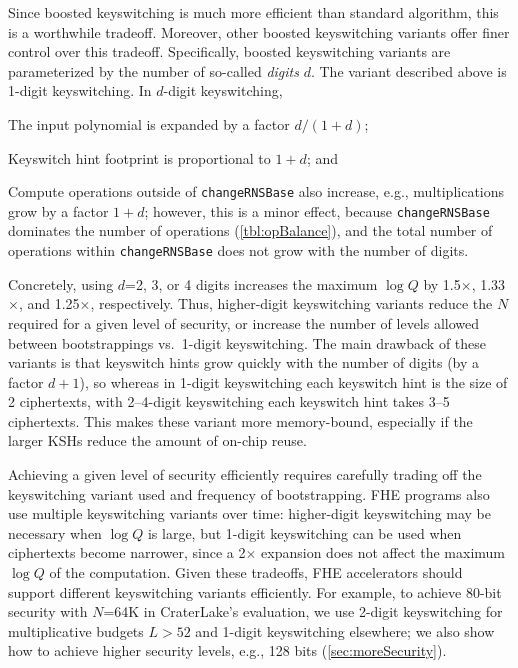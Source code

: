 Since boosted keyswitching is much more efficient than standard algorithm, this
is a worthwhile tradeoff. Moreover, other boosted keyswitching variants offer
finer control over this tradeoff. Specifically, boosted keyswitching variants
are parameterized by the number of so-called \emph{digits} $d$. The variant
described above is 1-digit keyswitching.
In $d$-digit keyswitching,
\begin{compactenum}
\item The input polynomial is expanded by a factor $d/(1+d)$;
\item Keyswitch hint footprint is proportional to $1+d$; and
\item Compute operations outside of \texttt{changeRNSBase} also increase, e.g.,
    multiplications grow by a factor $1+d$; however, this is a minor effect,
    because \texttt{changeRNSBase} dominates the number of operations
    (\autoref{tbl:opBalance}), and the total number of operations within
    \texttt{changeRNSBase} does not grow with the number of digits.
\end{compactenum}

Concretely, using $d$=2, 3, or 4 digits increases the maximum $\log Q$ by
1.5$\times$, 1.33$\times$, and 1.25$\times$, respectively. Thus, higher-digit
keyswitching variants reduce the $N$ required for a given level of security, or
increase the number of levels allowed between bootstrappings vs.\ 1-digit
keyswitching. The main drawback of these variants is that keyswitch hints grow
quickly with the number of digits (by a factor $d+1$), so whereas in 1-digit
keyswitching each keyswitch hint is the size of 2 ciphertexts, with 2--4-digit
keyswitching each keyswitch hint takes 3--5 ciphertexts. This makes these
variant more memory-bound, especially if the larger KSHs reduce the amount of
on-chip reuse.

Achieving a given level of security efficiently requires carefully trading off
the keyswitching variant used and frequency of bootstrapping. FHE programs also
use multiple keyswitching variants over time: higher-digit keyswitching may be
necessary when $\log Q$ is large, but 1-digit keyswitching can be used when
ciphertexts become narrower, since a 2$\times$ expansion does not affect the
maximum $\log Q$ of the computation. Given these tradeoffs, FHE accelerators
should support different keyswitching variants efficiently. For example, to
achieve 80-bit security with $N$=64K in CraterLake's evaluation, we use 2-digit
keyswitching for multiplicative budgets $L>52$ and 1-digit keyswitching
elsewhere; we also show how to achieve higher security levels, e.g., 128 bits
(\autoref{sec:moreSecurity}).

